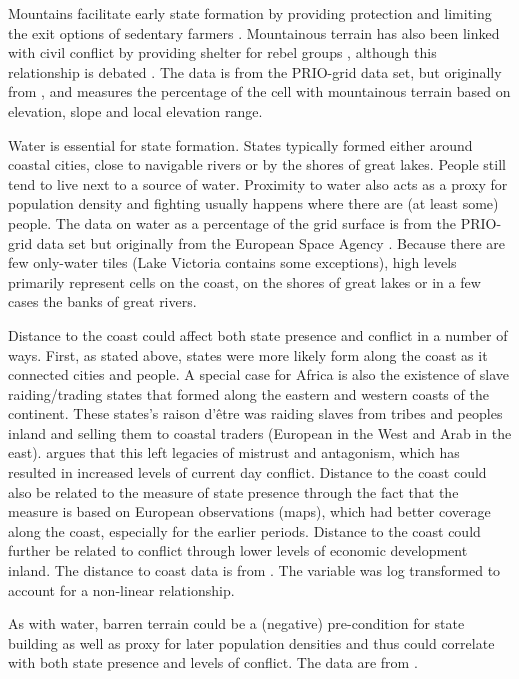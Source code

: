 \documentclass[12pt]{article}
\begin{document}
Mountains facilitate early state formation by providing protection and limiting the
exit options of sedentary farmers \citep{Carneiro1988}. Mountainous terrain has
also been linked with civil conflict by providing shelter for rebel groups
\citep{Hegre2006}, although this relationship is debated \citep{Buhaug2002}. The
data is from the PRIO-grid data set, but originally from \citet{Blyth2002}, and
measures the percentage of the cell with mountainous terrain based on elevation,
slope and local elevation range.

Water is essential for state formation. States typically formed either around
coastal cities, close to navigable rivers or by the shores of great lakes.
People still tend to live next to a source of water. Proximity to water also acts
as a proxy for population density and fighting usually happens where there are
(at least some) people. The data on water as a percentage of the grid surface is
from the PRIO-grid data set but originally from the European Space Agency
\citep{Bontemps2009}. Because there are few only-water tiles (Lake Victoria
contains some exceptions), high levels primarily represent cells on the coast,
on the shores of great lakes or in a few cases the banks of great rivers.

Distance to the coast could affect both state presence and conflict in a number
of ways. First, as stated above, states were more likely form along the coast as
it connected cities and people. A special case for Africa is also the existence
of slave raiding/trading states that formed along the eastern and western coasts
of the continent. These states's raison d'être was raiding slaves from tribes and
peoples inland and selling them to coastal traders (European in the West and
Arab in the east). \citet{Nunn2008} argues that this left legacies of mistrust
and antagonism, which has resulted in increased levels of current day conflict.
Distance to the coast could also be related to the measure of state presence
through the fact that the measure is based on European observations (maps),
which had better coverage along the coast, especially for the earlier periods.
Distance to the coast could further be related to conflict through lower levels
of economic development inland. The distance to coast data is from
\citet{Wessel1996}. The variable was log transformed to account for a non-linear
relationship.

As with water, barren terrain could be a (negative) pre-condition for state
building as well as proxy for later population densities and thus could
correlate with both state presence and levels of conflict. The data are from
\citet{Bontemps2009}.
\end{document}
